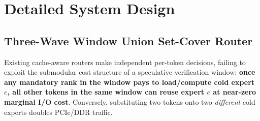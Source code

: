 \documentclass[10pt,twocolumn]{article}
\theoremstyle{definition}
\begin{document}
\section{Detailed System Design}
\label{sec:design}

\subsection{Three-Wave Window Union Set-Cover Router}
\label{sec:router}

Existing cache-aware routers make independent per-token decisions, failing to exploit the submodular cost structure of a speculative verification window: \textbf{once any mandatory rank in the window pays to load/compute cold expert $e$, all other tokens in the same window can reuse expert $e$ at near-zero marginal I/O cost}. Conversely, substituting two tokens onto two \emph{different} cold experts doubles PCIe/DDR traffic.
\end{document}
